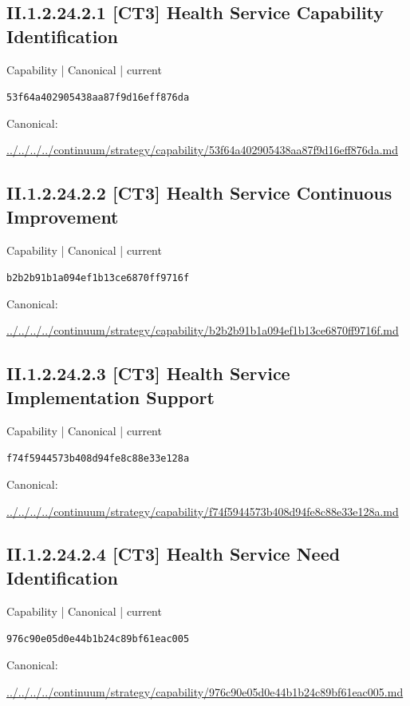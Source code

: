 \documentclass[10pt,a4paper]{article}
\begin{document}
\subsection*{II.1.2.24.2.1 [CT3] Health Service Capability Identification}
{\small Capability | Canonical | current}\par
\texttt{53f64a402905438aa87f9d16eff876da}\par
Canonical: \par
{\footnotesize\url{../../../../continuum/strategy/capability/53f64a402905438aa87f9d16eff876da.md}}\par
\subsection*{II.1.2.24.2.2 [CT3] Health Service Continuous Improvement}
{\small Capability | Canonical | current}\par
\texttt{b2b2b91b1a094ef1b13ce6870ff9716f}\par
Canonical: \par
{\footnotesize\url{../../../../continuum/strategy/capability/b2b2b91b1a094ef1b13ce6870ff9716f.md}}\par
\subsection*{II.1.2.24.2.3 [CT3] Health Service Implementation Support}
{\small Capability | Canonical | current}\par
\texttt{f74f5944573b408d94fe8c88e33e128a}\par
Canonical: \par
{\footnotesize\url{../../../../continuum/strategy/capability/f74f5944573b408d94fe8c88e33e128a.md}}\par
\subsection*{II.1.2.24.2.4 [CT3] Health Service Need Identification}
{\small Capability | Canonical | current}\par
\texttt{976c90e05d0e44b1b24c89bf61eac005}\par
Canonical: \par
{\footnotesize\url{../../../../continuum/strategy/capability/976c90e05d0e44b1b24c89bf61eac005.md}}\par
\end{document}
